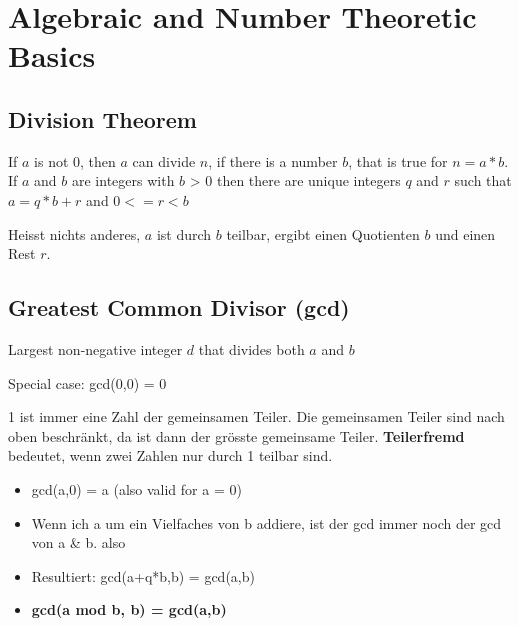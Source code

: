 \hypertarget{algebraic-and-number-theoretic-basics}{%
\section{Algebraic and Number Theoretic Basics}\label{algebraic-and-number-theoretic-basics}}

\hypertarget{division-theorem}{%
\subsection{Division Theorem}\label{division-theorem}}

If $a$ is not 0, then $a$ can divide $n$, if there is a number $b$, that is true
for $n = a * b$.
If $a$ and $b$ are integers with $b$ \textgreater{} $0$ then there are unique
integers $q$ and $r$ such that $a = q*b+r$ and $0 <= r < b$

\begin{tcolorbox}[colback=red!5!white,colframe=red!75!black]
    Heisst nichts anderes, $a$ ist durch $b$ teilbar, ergibt einen Quotienten $b$ und einen Rest $r$.
\end{tcolorbox}

\hypertarget{greatest-common-divisor-gcd}{%
\subsection{Greatest Common Divisor
(gcd)}\label{greatest-common-divisor-gcd}}

Largest non-negative integer $d$ that divides both $a$ and $b$

\begin{tcolorbox}[colback=red!5!white,colframe=red!75!black]
    Special case: gcd(0,0) = 0 
\end{tcolorbox}

1 ist immer eine Zahl der gemeinsamen Teiler. Die gemeinsamen Teiler sind nach oben beschränkt, da ist dann der grösste gemeinsame Teiler. \textbf{Teilerfremd} bedeutet, wenn zwei Zahlen nur durch 1 teilbar sind.

\begin{itemize}
\tightlist
\item
  gcd(a,0) = \textbar{}a\textbar{} (also valid for a = 0)
\item
  Wenn ich a um ein Vielfaches von b addiere, ist der gcd immer noch der
  gcd von a \& b. also
\item
  Resultiert: gcd(a+q*b,b) = gcd(a,b)
\item
  \textbf{gcd(a mod b, b) = gcd(a,b)}
\end{itemize}

